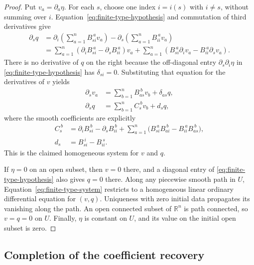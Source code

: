 \documentclass[11pt]{article}
\newcommand{\R}{\mathbb R}
\theoremstyle{remark}
\numberwithin{equation}{section}
\begin{document}
\begin{proof}
Put $v_a=\partial_a\eta$.  For each $s$, choose one index $i=i(s)$ with
$i\ne s$, without summing over $i$.  Equation~\eqref{eq:finite-type-hypothesis}
and commutation of third derivatives give
\begin{align*}
 \partial_s q
 &=\partial_i\left(\sum_{a=1}^n B_{si}^{\ a}v_a\right)
       -\partial_s\left(\sum_{a=1}^n B_{ii}^{\ a}v_a\right)\\
 &=\sum_{a=1}^n
       (\partial_i B_{si}^{\ a}-\partial_s B_{ii}^{\ a})v_a
    +\sum_{a=1}^n
       (B_{si}^{\ a}\partial_i v_a-B_{ii}^{\ a}\partial_s v_a).
\end{align*}
There is no derivative of $q$ on the right because the off-diagonal
entry $\partial_s\partial_i\eta$ in
\eqref{eq:finite-type-hypothesis} has $\delta_{si}=0$.
Substituting that equation for the derivatives of $v$ yields
\begin{equation}\label{eq:finite-type-system}
 \begin{aligned}
  \partial_s v_a&=\sum_{b=1}^n B_{as}^{\ b}v_b+\delta_{as}q,\\
  \partial_s q&=\sum_{b=1}^n C_s^{\ b}v_b+d_s q,
 \end{aligned}
\end{equation}
where the smooth coefficients are explicitly
\begin{equation}\label{eq:finite-type-coefficients}
 \begin{aligned}
 C_s^{\ b}
   &=\partial_i B_{si}^{\ b}-\partial_s B_{ii}^{\ b}
     +\sum_{a=1}^n
       \bigl(B_{si}^{\ a}B_{ai}^{\ b}-B_{ii}^{\ a}B_{as}^{\ b}\bigr),\\
 d_s&=B_{si}^{\ i}-B_{ii}^{\ s}.
 \end{aligned}
\end{equation}
This is the claimed homogeneous system for $v$ and $q$.

If $\eta=0$ on an open subset, then $v=0$ there, and a diagonal entry of
\eqref{eq:finite-type-hypothesis} also gives $q=0$ there.  Along any
piecewise smooth path in $U$, Equation~\eqref{eq:finite-type-system}
restricts to a homogeneous linear ordinary differential equation for
$(v,q)$.  Uniqueness with zero initial data propagates its vanishing along
the path.  An open connected subset of $\R^n$ is path connected, so
$v=q=0$ on $U$.  Finally, $\eta$ is constant on $U$, and its value on the
initial open subset is zero.
\end{proof}

\subsection{Completion of the coefficient recovery}
\end{document}

